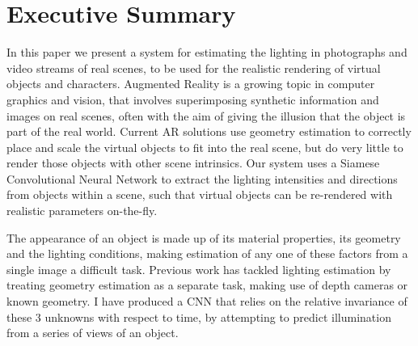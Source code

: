 \documentclass[ %
                    author={Gavin Parker},
                supervisor={Dr. Neill Campbell},
                    degree={MEng},
                     title={Deep Siamese Networks for Illumination Estimation from Stereo Images},
                  subtitle={},
                      type={research},
                      year={2018} ]{dissertation}
\begin{document}
\frontmatter


\makedecl


\tableofcontents
\listoffigures
\listoftables
\listofalgorithms
\lstlistoflistings



\chapter*{Executive Summary}

\noindent
In this paper we present a system for estimating the lighting in photographs and video streams of real scenes,  to be used for the realistic rendering of virtual objects and characters. Augmented Reality is a growing topic in computer graphics and vision, that involves superimposing synthetic information and images on real scenes, often with the aim of giving the illusion that the object is part of the real world. Current AR solutions use geometry estimation to correctly place and scale the virtual objects to fit into the real scene, but do very little to render those objects with other scene intrinsics. Our system uses a Siamese Convolutional Neural Network to extract the lighting intensities and directions from objects within a scene, such that virtual objects can be re-rendered with realistic parameters on-the-fly.

The appearance of an object is made up of its material properties, its geometry and the lighting conditions, making estimation of any one of these factors from a single image a difficult task. Previous work has tackled lighting estimation by treating geometry estimation as a separate task, making use of depth cameras or known geometry. I have produced a CNN that relies on the relative invariance of these 3 unknowns with respect to time, by attempting to predict illumination from a series of views of an object.
\end{document}
